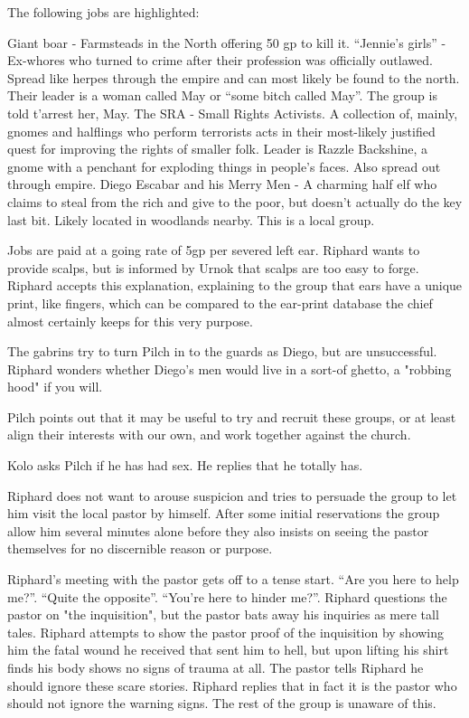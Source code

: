 \documentclass[letterpaper,10pt,twoside,twocolumn,openany]{book}
\begin{document}
The following jobs are highlighted:

    Giant boar - Farmsteads in the North offering 50 gp to kill it.
    “Jennie’s girls” - Ex-whores who turned to crime after their profession was officially outlawed. Spread like herpes through the empire and can most likely be found to the north. Their leader is a woman called May or “some bitch called May”. The group is told t'arrest her, May.
    The SRA - Small Rights Activists. A collection of, mainly, gnomes and halflings who perform terrorists acts in their most-likely justified quest for improving the rights of smaller folk. Leader is Razzle Backshine, a gnome with a penchant for exploding things in people’s faces. Also spread out through empire.
    Diego Escabar and his Merry Men - A charming half elf who claims to steal from the rich and give to the poor, but doesn’t actually do the key last bit. Likely located in woodlands nearby. This is a local group.

Jobs are paid at a going rate of 5gp per severed left ear. Riphard wants to provide scalps, but is informed by Urnok that scalps are too easy to forge. Riphard accepts this explanation, explaining to the group that ears have a unique print, like fingers, which can be compared to the ear-print database the chief almost certainly keeps for this very purpose.

The gabrins try to turn Pilch in to the guards as Diego, but are unsuccessful. Riphard wonders whether Diego's men would live in a sort-of ghetto, a "robbing hood" if you will.

Pilch points out that it may be useful to try and recruit these groups, or at least align their interests with our own, and work together against the church.

Kolo asks Pilch if he has had sex. He replies that he totally has.

Riphard does not want to arouse suspicion and tries to persuade the group to let him visit the local pastor by himself. After some initial reservations the group allow him several minutes alone before they also insists on seeing the pastor themselves for no discernible reason or purpose.

Riphard's meeting with the pastor gets off to a tense start. “Are you here to help me?”. “Quite the opposite”. “You’re here to hinder me?”. Riphard questions the pastor on "the inquisition", but the pastor bats away his inquiries as mere tall tales. Riphard attempts to show the pastor proof of the inquisition by showing him the fatal wound he received that sent him to hell, but upon lifting his shirt finds his body shows no signs of trauma at all. The pastor tells Riphard he should ignore these scare stories. Riphard replies that in fact it is the pastor who should not ignore the warning signs. The rest of the group is unaware of this.
\end{document}
